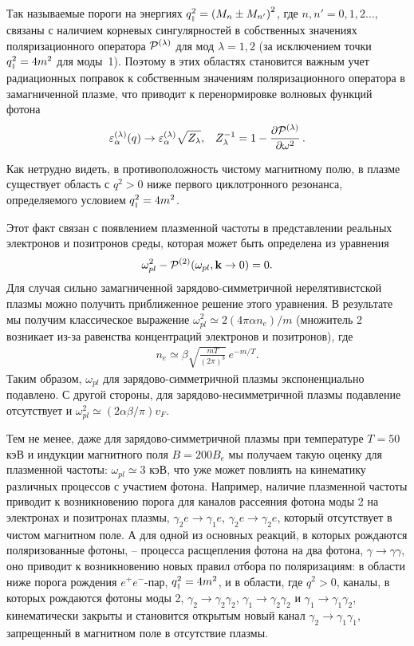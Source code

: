 	Так называемые пороги на энергиях $q_{\mbox{\tiny $\|$}}^2=\left(M_n\pm M_{n'}\right)^2$, где $n,n'=0,1,2 \ldots$, связаны с наличием корневых сингулярностей в собственных значениях поляризационного оператора ${\cal P}^{(\lambda)}$ для мод $\lambda=1,2$ (за исключением точки $q^2_{\mbox{\tiny $\|$}}=4m^2$ для  моды~1). Поэтому в этих областях становится важным учет радиационных поправок к собственным значениям поляризационного оператора в замагниченной плазме, что приводит к перенормировке волновых функций фотона
\begin{equation}\label{eq:renormPhotons}
	\varepsilon^{(\lambda)}_\alpha(q)\to\varepsilon^{(\lambda)}_\alpha \sqrt{Z_\lambda}, \,\,\,\,\, Z_\lambda^{-1}=1-\frac{\partial {\cal P}^{(\lambda)}}{\partial\omega^2}\, .
\end{equation}

Как нетрудно видеть, в противоположность чистому 
магнитному полю, в плазме существует область с  $q^2 > 0$ ниже  первого  
циклотронного резонанса, определяемого условием $q^2_{\mbox{\tiny $\|$}} = 4 m^2$. 

Этот факт связан  с появлением плазменной частоты в представлении реальных электронов и позитронов среды, 
которая может быть определена из уравнения
%
\begin{equation}
\omega_{pl}^2 - {\cal P}^{(2)} (\omega_{pl}, {\mathbf k} \to 0 ) = 0.
\label{eq:omegapl}
\end{equation}
%
Для случая сильно замагниченной зарядово-симметричной нерелятивистской плазмы 
можно получить приближенное решение этого уравнения. В результате мы получим 
классическое выражение $\omega_{pl}^2 \simeq 2(4\pi \alpha n_{e})/m$ (множитель 
2 возникает из-за равенства концентраций электронов и позитронов), где
%
\begin{eqnarray}
n_{e} \simeq \beta \sqrt{\frac{m T}{(2\pi)^3}}\,e^{-m/T}.
\label{eq:ne}
\end{eqnarray}
\noindent Таким образом, $\omega_{pl}$ для зарядово-симметричной плазмы экспоненциально подавлено. С другой стороны, для зарядово-несимметричной плазмы подавление отсутствует и $\omega_{pl}^2 \simeq (2\alpha \beta/\pi)v_F$.

Тем не менее, даже для зарядово-симметричной плазмы при температуре $T=50$ кэВ 
и индукции магнитного поля $B=200 B_e$ мы получаем такую оценку для плазменной 
частоты: $\omega_{pl} \simeq 3$ кэВ, что уже может повлиять на кинематику 
различных процессов с участием фотона. Например, наличие плазменной частоты 
приводит к возникновению порога для каналов рассеяния фотона моды 2 на 
электронах и позитронах плазмы, $\gamma_2 e \to \gamma_1 e$, $\gamma_2 e \to 
\gamma_2 e$, который отсутствует в чистом магнитном поле. А для одной из 
основных реакций, в которых рождаются поляризованные фотоны, -- процесса 
расщепления фотона на два фотона, $\gamma \to \gamma \gamma$, оно приводит к 
возникновению новых правил отбора по поляризациям: в области ниже порога 
рождения $e^+e^-$-пар, $q^2_{\mbox{\tiny $\|$}} = 4 m^2$, и в области, где $q^2 > 0$, 
каналы, в которых рождаются фотоны моды 2, $\gamma_2 \to \gamma_2 \gamma_2$,
$\gamma_1 \to \gamma_2 \gamma_2$ и $\gamma_1 \to \gamma_1 \gamma_2$, кинематически закрыты и становится открытым новый канал $\gamma_2 \to \gamma_1 \gamma_1$, запрещенный в магнитном поле в отсутствие плазмы.

